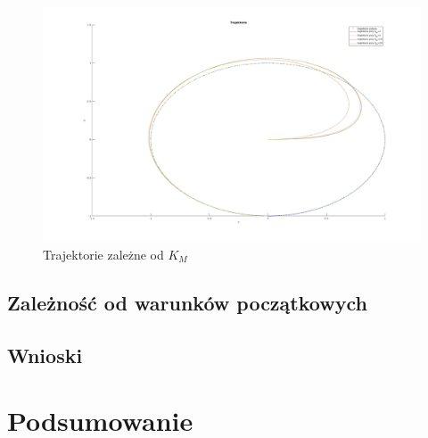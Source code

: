 \documentclass[12pt,a4paper]{article}
\begin{document}
  \begin{figure}[H]
    \centering
    \includegraphics[width=1\textwidth]{figures/dyn_trajektoria_km.png}
    \caption{Trajektorie zależne od $K_M$}
    \label{fig:10}
  \end{figure}



  \subsection{Zależność od warunków początkowych}

  \subsection{Wnioski}

  
\section{Podsumowanie}

\end{document}
